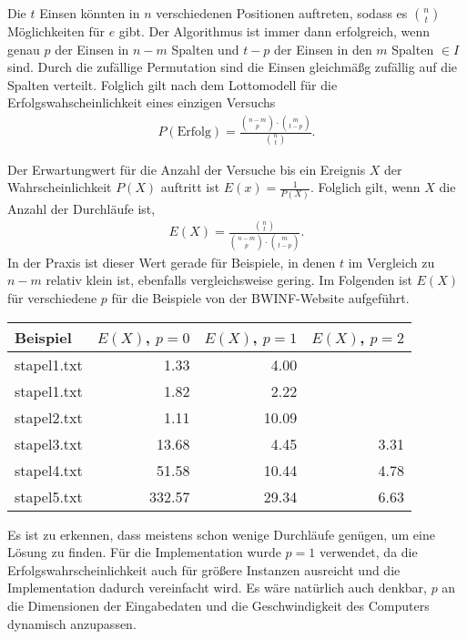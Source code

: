 \documentclass[a4paper,10pt,ngerman]{scrartcl}
\begin{document}
Die $t$ Einsen könnten in $n$ verschiedenen Positionen auftreten, sodass es $\binom{n}{t}$ Möglichkeiten für $e$ gibt. Der Algorithmus ist immer dann erfolgreich, wenn genau $p$ der Einsen in $n-m$ Spalten und $t-p$ der Einsen in den $m$ Spalten $\in I$ sind. Durch die zufällige Permutation sind die Einsen gleichmäßg zufällig auf die Spalten verteilt. Folglich gilt nach dem Lottomodell für die Erfolgswahscheinlichkeit eines einzigen Versuchs
\begin{align*}
    P(\text{Erfolg}) = \frac{\binom{n-m}{p} \cdot \binom{m}{t-p}}{\binom{n}{t}}.
\end{align*}

Der Erwartungwert für die Anzahl der Versuche bis ein Ereignis $X$ der Wahrscheinlichkeit $P(X)$ auftritt ist $E(x) = \frac{1}{P(X)}$.
Folglich gilt, wenn $X$ die Anzahl der Durchläufe ist,
\begin{align*}
    E(X) = \frac{\binom{n}{t}}{\binom{n-m}{p} \cdot \binom{m}{t-p}}.
\end{align*} 
In der Praxis ist dieser Wert gerade für Beispiele, in denen $t$ im Vergleich zu $n-m$ relativ klein ist, ebenfalls vergleichsweise gering. 
Im Folgenden ist $E(X)$ für verschiedene $p$ für die Beispiele von der BWINF-Website aufgeführt.
\begin{table}[H]
    \centering
    \begin{tabular}{lrrr}
        \toprule
    
        Beispiel & $E(X)$, $p=0$ & $E(X)$, $p=1$ & $E(X)$, $p=2$ \\\midrule
        stapel1.txt &1.33	&4.00 &  \\
        stapel1.txt &1.82&	2.22&  \\
        stapel2.txt &1.11	&10.09&  \\
    stapel3.txt &13.68&	4.45&	3.31 \\
    stapel4.txt	&51.58&	10.44 &4.78 \\
    stapel5.txt	&332.57	&29.34&	6.63\\\bottomrule
    \end{tabular}
\end{table}
Es ist zu erkennen, dass meistens schon wenige Durchläufe genügen, um eine Lösung zu finden. 
Für die Implementation wurde $p=1$ verwendet, da die Erfolgswahrscheinlichkeit auch für größere Instanzen ausreicht und die Implementation dadurch vereinfacht wird. Es wäre natürlich auch denkbar, $p$ an die Dimensionen der Eingabedaten und die Geschwindigkeit des Computers dynamisch anzupassen.
\end{document}
